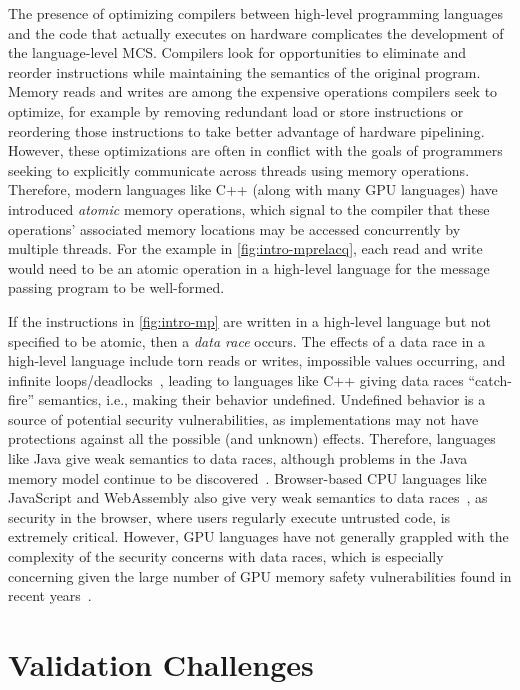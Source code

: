The presence of optimizing compilers between high-level programming languages and the code that actually executes on hardware complicates the development of the language-level MCS. Compilers look for opportunities to eliminate and reorder instructions while maintaining the semantics of the original program. Memory reads and writes are among the expensive operations compilers seek to optimize, for example by removing redundant load or store instructions or reordering those instructions to take better advantage of hardware pipelining. However, these optimizations are often in conflict with the goals of programmers seeking to explicitly communicate across threads using memory operations. Therefore, modern languages like C++ (along with many GPU languages) have introduced \textit{atomic} memory operations, which signal to the compiler that these operations' associated memory locations may be accessed concurrently by multiple threads. For the example in \myfig\ref{fig:intro-mprelacq}, each read and write would need to be an atomic operation in a high-level language for the message passing program to be well-formed.

If the instructions in \myfig\ref{fig:intro-mp} are written in a high-level language but not specified to be atomic, then a \textit{data race} occurs. The effects of a data race in a high-level language include torn reads or writes, impossible values occurring, and infinite loops/deadlocks~\cite{boehm2011benign,dolan2018bounding}, leading to languages like C++ giving data races ``catch-fire'' semantics, i.e., making their behavior undefined. Undefined behavior is a source of potential security vulnerabilities, as implementations may not have protections against all the possible (and unknown) effects. Therefore, languages like Java give weak semantics to data races, although problems in the Java memory model continue to be discovered~\cite{panneke2026jmt}. Browser-based CPU languages like JavaScript and WebAssembly also give very weak semantics to data races~\cite{watt2020repairing,watt2019weakening}, as security in the browser, where users regularly execute untrusted code, is extremely critical. However, GPU languages have not generally grappled with the complexity of the security concerns with data races, which is especially concerning given the large number of GPU memory safety vulnerabilities found in recent years~\cite{lee2014stealing,donaldson2017graphicsfuzz,sorensen2024leftoverlocals,pustelnik2024whispering,guo2024usenix}.

\section{Validation Challenges}

